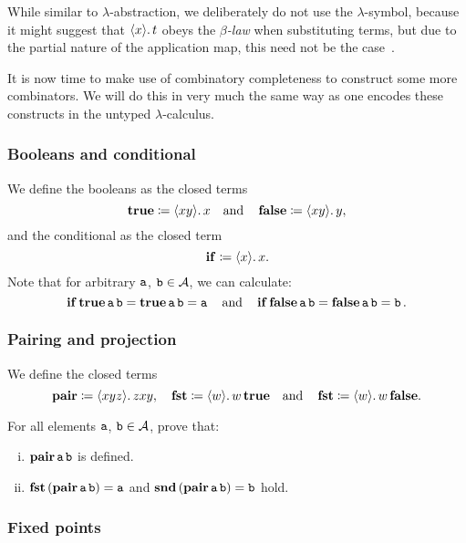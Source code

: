 \begin{remark}
  While similar to \(\lambda\)-abstraction, we deliberately do not use the
  \(\lambda\)-symbol, because it might suggest that \(\langle{{x}}\rangle.\,{t}\) obeys the
  \emph{\(\beta\)-law} when substituting terms, but due to the partial nature of
  the application map, this need not be the case~\cite[p.~4]{vanOosten2008}.
\end{remark}

It is now time to make use of combinatory completeness to construct some more
combinators. We will do this in very much the same way as one encodes these
constructs in the untyped \(\lambda\)-calculus.

\subsubsection*{Booleans and conditional}\label{sec:booleans}

We define the booleans as the closed terms
\[
  \operatorname{\mathbf{true}} \coloneqq \langle{{xy}}\rangle.\,{x} \quad\text{and}\quad \operatorname{\mathbf{false}} \coloneqq
  \langle{{xy}}\rangle.\,{y},
\]
and the conditional as the closed term
\[
  \operatorname{\mathbf{if}} \coloneq \langle{{x}}\rangle.\,{x}.
\]
%
Note that for arbitrary \(\operatorname{\mathtt{a}}\), \(\operatorname{\mathtt{b}} \in \mathcal A\), we can calculate:
\[
  \operatorname{\mathbf{if}}\operatorname{\mathbf{true}}\operatorname{\mathtt{a}}\operatorname{\mathtt{b}} = \operatorname{\mathbf{true}}\operatorname{\mathtt{a}}\operatorname{\mathtt{b}} = \operatorname{\mathtt{a}}
  \quad
  \text{and}
  \quad
  \operatorname{\mathbf{if}}\operatorname{\mathbf{false}}\operatorname{\mathtt{a}}\operatorname{\mathtt{b}} = \operatorname{\mathbf{false}}\operatorname{\mathtt{a}}\operatorname{\mathtt{b}} = \operatorname{\mathtt{b}}.
\]

\subsubsection*{Pairing and projection}

We define the closed terms
\[
  \operatorname{\mathbf{pair}} \coloneqq \langle{{xyz}}\rangle.\,{z}{xy},
  \quad
  \operatorname{\mathbf{fst}} \coloneqq \langle{{w}}\rangle.\,{w\operatorname{\mathbf{true}}}
  \quad
  \text{and}
  \quad
  \operatorname{\mathbf{fst}} \coloneqq \langle{{w}}\rangle.\,{w\operatorname{\mathbf{false}}}.
\]

\begin{exercise}\label{exer:pairing-projection}
  For all elements \(\operatorname{\mathtt{a}}\), \(\operatorname{\mathtt{b}} \in \mathcal A\), prove that:
  \begin{enumerate}[(i)]
  \item \(\operatorname{\mathbf{pair}} \operatorname{\mathtt{a}} \operatorname{\mathtt{b}}\) is defined.
  \item \(\operatorname{\mathbf{fst}}{(\operatorname{\mathbf{pair}}\operatorname{\mathtt{a}}\operatorname{\mathtt{b}})} = \operatorname{\mathtt{a}}\) and
    \(\operatorname{\mathbf{snd}}{(\operatorname{\mathbf{pair}}\operatorname{\mathtt{a}}\operatorname{\mathtt{b}})} = \operatorname{\mathtt{b}}\) hold.
  \end{enumerate}
\end{exercise}

\subsubsection*{Fixed points}

